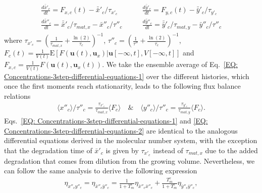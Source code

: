 \documentclass[%
 reprint,prx,
superscriptaddress,
%
%
%
%
%
%
%
%
%
 amsmath,amssymb,
 aps,
%
%
%
%
%
%
]{revtex4-2}
\begin{document}
{{\begin{align}
\begin{split}
\end{split} 
\label{EQ: Concentrations-3step-differential-equations-1}
\end{align}
\begin{align}
\begin{split} 
 \frac{d\bar{\bar{x}}'_{c}}{dt} = F_{x,c}(t) - \bar{\bar{x}}'_{c}/\tau_{x'_{c}} \quad & \quad \frac{d\bar{\bar{y}}'_{c}}{dt} = F_{y,c}(t) - \bar{\bar{y}}'_{c}/\tau_{y'_{c}} \\
 \frac{d\bar{\bar{x}}''_{c}}{dt} = \bar{\bar{x}}'_{c}/\tau_{mat,x} - \bar{x}''_{c}/\tau''_{c} \quad & \quad \frac{d\bar{\bar{y}}''_{c}}{dt} = \bar{\bar{y}}'_{c}/\tau_{mat,y} - \bar{y}''_{c}/\tau''_{c} 
\label{EQ: Concentrations-3step-differential-equations-2}
\end{split}
\end{align}
where $\tau_{x'_{c}} = (\frac{1}{\tau_{mat,x}} + \frac{\ln(2)}{\tau_{c}})^{-1}$, $\tau''_{c} = \left(\frac{1}{\tau''} + \frac{\ln(2)}{\tau_{c}}\right)^{-1}$, 
$F_{c}(t) = \frac{1}{V(t)}\mathrm{E}[F(\mathbf{u}(t), \mathbf{u}_{x})|\mathbf{u}[-\infty,t], V[-\infty,t]]$ and $F_{x,c} = \frac{1}{V(t)}F(\mathbf{u}(t), \mathbf{u}_{x}(t))$.  
We take the ensemble average of Eq.~\eqref{EQ: Concentrations-3step-differential-equations-1} over the different histories, which once the first moments reach stationarity, leads to the following flux balance relations 
\begin{align}
 \langle x''_{c} \rangle /\tau''_{c} = \frac{\tau_{x'_{c}}}{\tau_{mat,x}}\langle F_{c} \rangle \quad \text{\&} \quad \langle y''_{c} \rangle /\tau''_{c} = \frac{\tau_{y'_{c}}}{\tau_{mat,y}}\langle F_{c} \rangle .
 \label{EQ: FP concentration flux balance}
\end{align}
Eqs.~\eqref{EQ: Concentrations-3step-differential-equations-1} and \eqref{EQ: Concentrations-3step-differential-equations-2} are identical to the analogous differential equations derived in the molecular number system, with the exception that the degradation time of $\bar{x}'_{c}$ is given by 
$\tau_{x'_{c}}$ instead of $\tau_{mat,x}$ due to the added degradation that comes from dilution from the growing volume. Nevertheless, we can follow the same analysis to derive the following expression
\begin{align}
 \eta_{x''_{c}y''_{c}} = \eta_{\bar{x}''_{c}\bar{y}''_{c}} = \frac{1}{1 + T_{m}^{c}}\eta_{\bar{x}''_{c}\bar{x}''_{c}} + \frac{T_{m}^{c}}{1 + T_{m}^{c}}\eta_{\bar{y}''_{c}\bar{y}''_{c}} ,
\label{EQ: Concentrations-3step-fluctuation-balance}
\end{align}
}}
\end{document}

